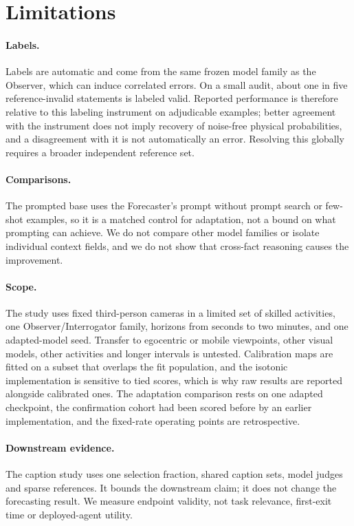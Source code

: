 \documentclass[10pt]{article}
\begin{document}
\section{Limitations}
\label{sec:limitations}

\paragraph{Labels.} Labels are automatic and come from the same frozen model family as the Observer, which can induce correlated errors. On a small audit, about one in five reference-invalid statements is labeled valid. Reported performance is therefore relative to this labeling instrument on adjudicable examples; better agreement with the instrument does not imply recovery of noise-free physical probabilities, and a disagreement with it is not automatically an error. Resolving this globally requires a broader independent reference set.

\paragraph{Comparisons.} The prompted base uses the Forecaster's prompt without prompt search or few-shot examples, so it is a matched control for adaptation, not a bound on what prompting can achieve. We do not compare other model families or isolate individual context fields, and we do not show that cross-fact reasoning causes the improvement.

\paragraph{Scope.} The study uses fixed third-person cameras in a limited set of skilled activities, one Observer/Interrogator family, horizons from seconds to two minutes, and one adapted-model seed. Transfer to egocentric or mobile viewpoints, other visual models, other activities and longer intervals is untested. Calibration maps are fitted on a subset that overlaps the fit population, and the isotonic implementation is sensitive to tied scores, which is why raw results are reported alongside calibrated ones. The adaptation comparison rests on one adapted checkpoint, the confirmation cohort had been scored before by an earlier implementation, and the fixed-rate operating points are retrospective.

\paragraph{Downstream evidence.} The caption study uses one selection fraction, shared caption sets, model judges and sparse references. It bounds the downstream claim; it does not change the forecasting result. We measure endpoint validity, not task relevance, first-exit time or deployed-agent utility.
\end{document}
